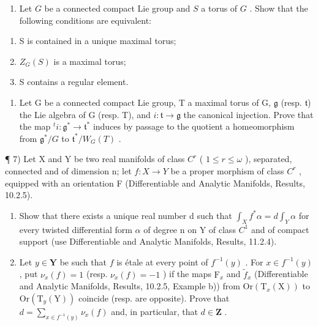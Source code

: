 \begin{enumerate}
\def\labelenumi{\arabic{enumi})}
\setcounter{enumi}{4}
\tightlist
\item
  Let \(G\) be a connected compact Lie group and \(S\) a torus of \(G\) . Show that the following conditions are equivalent:
\end{enumerate}

\begin{enumerate}
\def\labelenumi{(\roman{enumi})}
\item
  S is contained in a unique maximal torus;
\item
  \(Z_{G}(S)\) is a maximal torus;
\item
  S contains a regular element.
\end{enumerate}

\begin{enumerate}
\def\labelenumi{\arabic{enumi})}
\setcounter{enumi}{5}
\tightlist
\item
  Let G be a connected compact Lie group, T a maximal torus of G, \(\mathfrak{g}\) (resp. \(\mathfrak{t}\)) the Lie algebra of G (resp. T), and \(i : \mathfrak{t} \to \mathfrak{g}\) the canonical injection. Prove that the map \(^{t}i : \mathfrak{g}^{*} \to \mathfrak{t}^{*}\) induces by passage to the quotient a homeomorphism from \(\mathfrak{g}^{*}/G\) to \(\mathfrak{t}^{*}/W_{G}(T)\) .
\end{enumerate}

¶ 7) Let X and Y be two real manifolds of class \(C^{r}\) ( \(1 \leq r \leq \omega\) ), separated, connected and of dimension n; let \(f : X \to Y\) be a proper morphism of class \(C^{r}\) , equipped with an orientation F (Differentiable and Analytic Manifolds, Results, 10.2.5).

\begin{enumerate}
\def\labelenumi{\alph{enumi})}
\item
  Show that there exists a unique real number d such that \(\int_{X} f^{*}\alpha = d\int_{Y}\alpha\) for every twisted differential form \(\alpha\) of degree n on Y of class \(C^{1}\) and of compact support (use Differentiable and Analytic Manifolds, Results, 11.2.4).
\item
  Let \(y \in \mathbf{Y}\) be such that \(f\) is étale at every point of \(f^{-1}(y)\) . For \(x \in f^{-1}(y)\) , put \(\nu_x(f) = 1\) (resp. \(\nu_x(f) = -1\) ) if the maps \(\mathrm{F}_x\) and \(\tilde{f}_x\) (Differentiable and Analytic Manifolds, Results, 10.2.5, Example b)) from \(\mathrm{Or}(\mathrm{T}_x(\mathrm{X}))\) to \(\mathrm{Or}(\mathrm{T}_y(\mathrm{Y}))\) coincide (resp. are opposite). Prove that \(d = \sum_{x \in f^{-1}(y)} \nu_x(f)\) and, in particular, that \(d \in \mathbf{Z}\) .
\end{enumerate}

